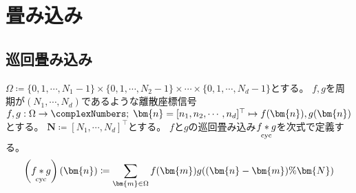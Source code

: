 \part{畳み込み}
		\chapter{巡回畳み込み}
		\label{巡回畳み込み}
		$\Omega \coloneqq \{0,1,\cdots,N_1-1\}\times\{0,1,\cdots,N_2-1\}\times\cdots\times\{0,1,\cdots,N_d-1\}$とする。
		$f,g$を周期が$(N_1,\cdots,N_d)$であるような離散座標信号$f,g: \Omega\to\complexNumbers;\;\bm{n} = [n_1,n_2,\cdots,n_d]^\top \mapsto f(\bm{n}),g(\bm{n})$とする。
		$\bm{N} \coloneqq [N_1,\cdots,N_d]^\top$とする。
		$f$と$g$の巡回畳み込み$\underset{\text{cyc}}{{f}*{g}}$を次式で定義する。
		\[ \left(\cycConv{f}{g}\right)(\bm{n}) \coloneqq \sum_{\bm{m} \in\Omega} f(\bm{m})g((\bm{n}-\bm{m})\%\bm{N}) \]

